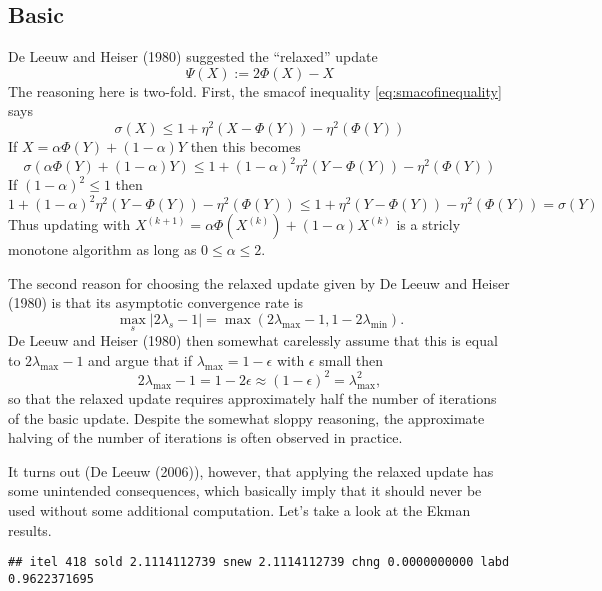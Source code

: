 \documentclass[
  12pt,
]{article}
\begin{document}
\subsection{Basic}\label{basic}

De Leeuw and Heiser (1980) suggested the ``relaxed'' update
\begin{equation}
\Psi(X):=2\Phi(X)-X
\end{equation}
The reasoning here is two-fold. First, the smacof inequality \eqref{eq:smacofinequality} says
\begin{equation}
\sigma(X)\leq 1+\eta^2(X-\Phi(Y))-\eta^2(\Phi(Y))
\end{equation}
If \(X=\alpha\Phi(Y)+(1-\alpha)Y\) then this becomes
\begin{equation}
\sigma(\alpha\Phi(Y)+(1-\alpha)Y)\leq 1+(1-\alpha)^2\eta^2(Y-\Phi(Y))-\eta^2(\Phi(Y))
\end{equation}
If \((1-\alpha)^2\leq 1\) then
\begin{equation}
1+(1-\alpha)^2\eta^2(Y-\Phi(Y))-\eta^2(\Phi(Y))\leq 1+\eta^2(Y-\Phi(Y))-\eta^2(\Phi(Y))=\sigma(Y)
\end{equation}
Thus updating with \(X^{(k+1)}=\alpha\Phi(X^{(k)})+(1-\alpha)X^{(k)}\) is a stricly
monotone algorithm as long as \(0\leq\alpha\leq 2\).

The second reason for choosing the relaxed update given by De Leeuw and Heiser (1980)
is that its asymptotic convergence rate is
\begin{equation}
\max_s|2\lambda_s-1|=\max(2\lambda_{\text{max}}-1,1-2\lambda_{\text{min}}).
\end{equation}
De Leeuw and Heiser (1980) then somewhat carelessly assume that this is equal to
\(2\lambda_{\text{max}}-1\) and argue that if \(\lambda_{\text{max}}=1-\epsilon\)
with \(\epsilon\) small then
\begin{equation}
2\lambda_{\text{max}}-1=1-2\epsilon\approx(1-\epsilon)^2=\lambda_{\text{max}}^2,
\end{equation}
so that the relaxed update requires approximately half the number of iterations of the
basic update. Despite the somewhat sloppy reasoning, the approximate halving of the number of iterations is often observed in practice.

It turns out (De Leeuw (2006)), however, that applying the relaxed update
has some unintended consequences, which basically imply that it should never
be used without some additional computation. Let's take a look at the
Ekman results.

\begin{verbatim}
## itel 418 sold 2.1114112739 snew 2.1114112739 chng 0.0000000000 labd 0.9622371695
\end{verbatim}
\end{document}
